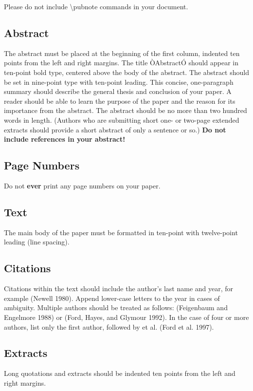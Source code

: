\documentclass[letterpaper]{article}
\begin{document}
Please do not include \textbackslash pubnote commands in your document.

\subsection{Abstract}
The abstract must be placed at the beginning of the first column, indented ten points from the left and right margins. The title ÒAbstractÓ should appear in ten-point bold type, centered above the body of the abstract. The abstract should be set in nine-point type with ten-point leading. This concise, one-paragraph summary should describe the general thesis and conclusion of your paper. A reader should be able to learn the purpose of the paper and the reason for its importance from the abstract. The abstract should be no more than two hundred words in length. (Authors who are submitting short one- or two-page extended extracts should provide a short abstract of only a sentence or so.) \textbf{Do not include references in your abstract!}

\subsection{Page Numbers}

Do not \textbf{ever} print any page numbers on your paper.

\subsection{Text }
The main body of the paper must be formatted in ten-point with twelve-point leading (line spacing).

\subsection{Citations}
Citations within the text should include the author's last name and year, for example (Newell 1980). Append lower-case letters to the year in cases of ambiguity. Multiple authors should be treated as follows: (Feigenbaum and Engelmore 1988) or (Ford, Hayes, and Glymour 1992). In the case of four or more authors, list only the first author, followed by et al. (Ford et al. 1997).

\subsection{Extracts}
Long quotations and extracts should be indented ten points from the left and right margins.
\end{document}
